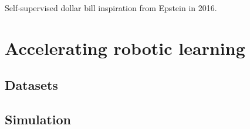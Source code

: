 \documentclass[\home/main.tex]{subfiles}
\begin{document}
Self-supervised dollar bill inspiration from Epstein in 2016.


%     

%         

%         

\section{Accelerating robotic learning}
\subsection{Datasets}
\subsection{Simulation}
\end{document}

